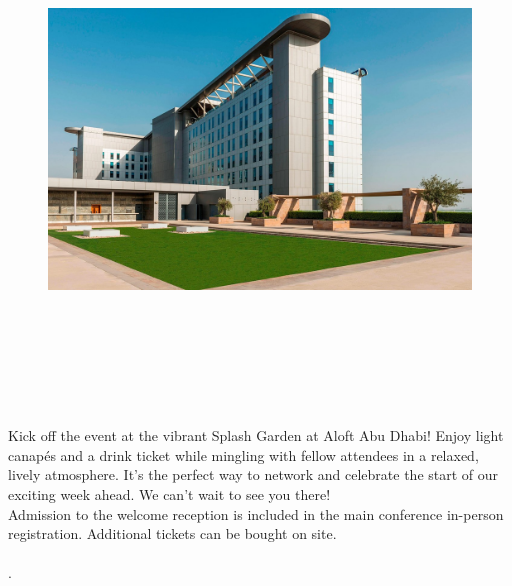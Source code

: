 \\
\begin{figure}[h!]
    \centering
        \includegraphics[width=0.45\linewidth]{examples/handbook_coling25/welcome_reception/splash-garden.png}
  \end{figure}

\\
\\
\\
\\
\\
\\

Kick off the event at the vibrant Splash Garden at Aloft Abu Dhabi! Enjoy light canapés and a drink ticket while mingling with fellow attendees in a relaxed, lively atmosphere. It’s the perfect way to network and celebrate the start of our exciting week ahead.
We can’t wait to see you there!\\
Admission to the welcome reception is included in the main conference in-person registration. Additional tickets can be bought on site.\\

\\
.
